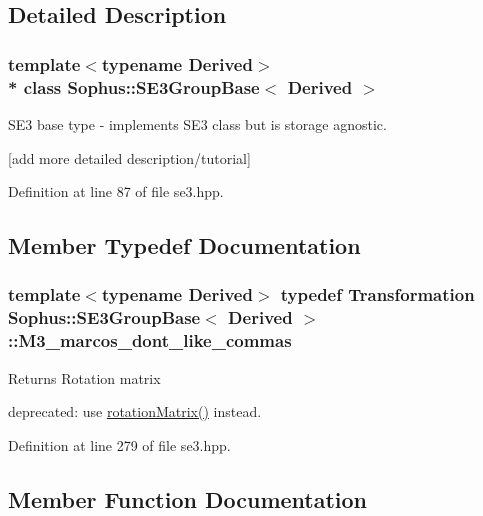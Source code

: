 \subsection{Detailed Description}
\subsubsection*{template$<$typename Derived$>$\\*
class Sophus\+::\+S\+E3\+Group\+Base$<$ Derived $>$}

S\+E3 base type -\/ implements S\+E3 class but is storage agnostic. 

\mbox{[}add more detailed description/tutorial\mbox{]} 

Definition at line 87 of file se3.\+hpp.



\subsection{Member Typedef Documentation}
\subsubsection[{\texorpdfstring{M3\+\_\+marcos\+\_\+dont\+\_\+like\+\_\+commas}{M3_marcos_dont_like_commas}}]{\setlength{\rightskip}{0pt plus 5cm}template$<$typename Derived$>$ typedef {\bf Transformation} {\bf Sophus\+::\+S\+E3\+Group\+Base}$<$ Derived $>$\+::{\bf M3\+\_\+marcos\+\_\+dont\+\_\+like\+\_\+commas}}\hypertarget{class_sophus_1_1_s_e3_group_base_a4a50d722144fb9350ef4beaa975e45b4}{}\label{class_sophus_1_1_s_e3_group_base_a4a50d722144fb9350ef4beaa975e45b4}
\begin{DoxyReturn}{Returns}
Rotation matrix
\end{DoxyReturn}
deprecated\+: use \hyperlink{class_sophus_1_1_s_e3_group_base_adbfc9d61a4a27f9b5e73fa22519e61de}{rotation\+Matrix()} instead. 

Definition at line 279 of file se3.\+hpp.



\subsection{Member Function Documentation}
